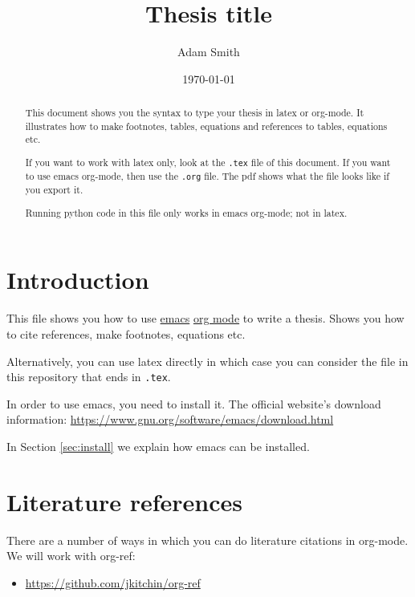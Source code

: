 \documentclass[11pt]{article}
\author{Adam Smith}
\date{\today}
\title{Thesis title}
\begin{document}
\maketitle
\begin{abstract}
This document shows you the syntax to type your thesis in latex or org-mode. It illustrates how to make footnotes, tables, equations and references to tables, equations etc.

If you want to work with latex only, look at the \texttt{.tex} file of this document. If you want to use emacs org-mode, then use the \texttt{.org} file. The pdf shows what the file looks like if you export it.

Running python code in this file only works in emacs org-mode; not in latex.
\end{abstract}

\newpage



\setcounter{tocdepth}{2}
\tableofcontents


\section{Introduction}
\label{sec:orgbab533a}
\label{sec:intro}

This file shows you how to use \href{https://www.gnu.org/software/emacs/}{emacs} \href{https://orgmode.org/}{org mode} to write a thesis. Shows you how to cite references, make footnotes, equations etc.

Alternatively, you can use latex directly in which case you can consider the file in this repository that ends in \texttt{.tex}.

In order to use emacs, you need to install it. The official website's download information: \url{https://www.gnu.org/software/emacs/download.html}

In Section \ref{sec:install} we explain how emacs can be installed.


\section{Literature references}
\label{sec:orgd785d69}

There are a number of ways in which you can do literature citations in org-mode. We will work with org-ref:
\begin{itemize}
\item \url{https://github.com/jkitchin/org-ref}
\end{itemize}
\end{document}

